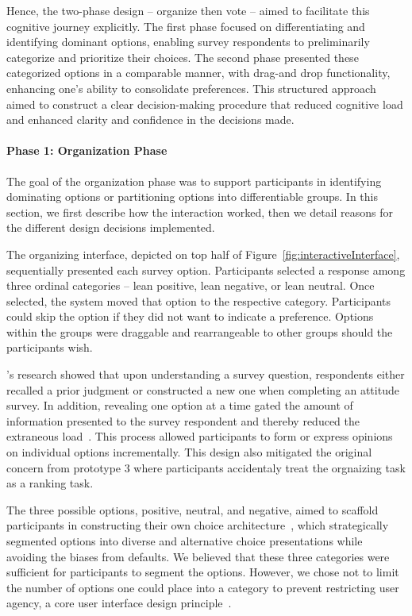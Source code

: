 Hence, the two-phase design -- organize then vote -- aimed to facilitate this cognitive journey explicitly. The first phase focused on differentiating and identifying dominant options, enabling survey respondents to preliminarily categorize and prioritize their choices. The second phase presented these categorized options in a comparable manner, with drag-and drop functionality, enhancing one's ability to consolidate preferences. This structured approach aimed to construct a clear decision-making procedure that reduced cognitive load and enhanced clarity and confidence in the decisions made.

\paragraph{Phase 1: Organization Phase}
The goal of the organization phase was to support participants in identifying dominating options or partitioning options into differentiable groups. In this section, we first describe how the interaction worked, then we detail reasons for the different design decisions implemented.

The organizing interface, depicted on top half of Figure~\ref{fig:interactiveInterface}, sequentially presented each survey option. Participants selected a response among three ordinal categories -- lean positive, lean negative, or lean neutral. Once selected, the system moved that option to the respective category. Participants could skip the option if they did not want to indicate a preference. Options within the groups were draggable and rearrangeable to other groups should the participants wish.

\textcite{strackThinkingJudgingCommunicating1987}'s research showed that upon understanding a survey question, respondents either recalled a prior judgment or constructed a new one when completing an attitude survey. In addition, revealing one option at a time gated the amount of information presented to the survey respondent and thereby reduced the extraneous load~\cite{swellerCognitiveLoadTheory2011}. This process allowed participants to form or express opinions on individual options incrementally. This design also mitigated the original concern from prototype 3 where participants accidentaly treat the orgnaizing task as a ranking task.

The three possible options, positive, neutral, and negative, aimed to scaffold participants in constructing their own choice architecture~\cite{munscherReviewTaxonomyChoice2016, thalerNudgeImprovingDecisions2008a}, which strategically segmented options into diverse and alternative choice presentations while avoiding the biases from defaults. We believed that these three categories were sufficient for participants to segment the options. However, we chose not to limit the number of options one could place into a category to prevent restricting user agency, a core user interface design principle~\cite{norman2013design}.

